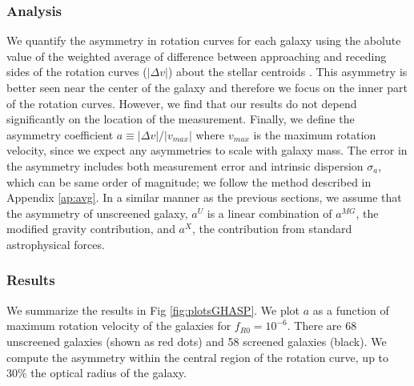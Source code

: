 \documentclass[useAMS,usenatbib,twocolumn]{mn2e}
\begin{document}
\subsubsection{Analysis}
We quantify the asymmetry in rotation curves for each galaxy
using the abolute value of the weighted average of difference between
approaching and receding sides of the rotation curves ($|\Delta v|$) about the
stellar centroids \citep{epinat08a}. This asymmetry is better seen near the
center of the galaxy and therefore we focus on the inner part of the
rotation curves. However, we find that our results do not depend
significantly on the location of the measurement. Finally, we define the
asymmetry coefficient $a \equiv |\Delta v| / |v_{max}|$ where $v_{max}$ is the
maximum rotation velocity, since we expect any asymmetries to scale with
galaxy mass.
The error in the asymmetry
includes both measurement error and intrinsic dispersion $\sigma_a$, which
can be same order of magnitude; we follow the method described in Appendix
\ref{ap:avg}. In a similar manner as the previous sections, we assume that
the asymmetry of unscreened galaxy, $a^U$ is a linear combination of
$a^{MG}$, the modified gravity contribution, and $a^X$, the contribution from
standard astrophysical forces.

% 


\subsubsection{Results}
We summarize the results in Fig \ref{fig:plotsGHASP}.  We plot  $a$
as a function of maximum rotation velocity of the galaxies for
$f_{R0}=10^{-6}$. There are 68 unscreened galaxies
(shown as red dots) and 58 screened galaxies (black).
We compute the asymmetry within the central region of the rotation curve,
up to 30\% the optical radius of the galaxy.
\end{document}
